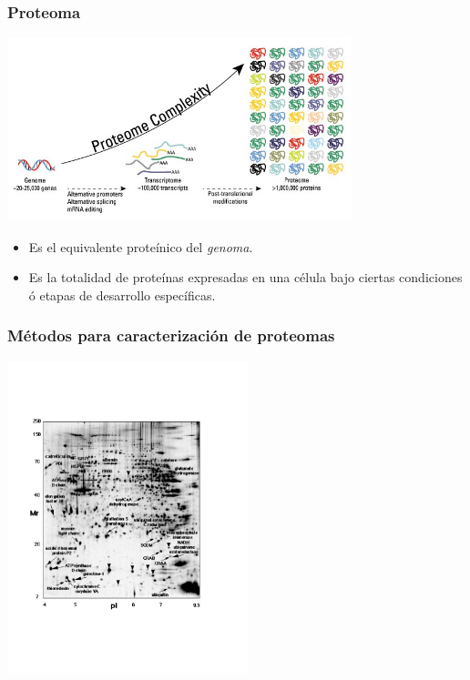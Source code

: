 \documentclass[10pt]{beamer}
\begin{document}
\begin{frame}
\frametitle{Proteoma}
\begin{center}
\includegraphics[width=10cm]{imagenes/Proteome}
\end{center}
\begin{itemize}
\item Es el equivalente proteínico del \emph{genoma}.
\pause
\item Es la totalidad de proteínas expresadas en una célula bajo ciertas condiciones ó etapas de desarrollo específicas.
\end{itemize}
\end{frame}
\begin{frame}
\frametitle{Métodos para caracterización de proteomas}
\begin{center}
\includegraphics[width=7cm]{imagenes/2DPAGE}
\end{center}
\end{frame}
\end{document}
